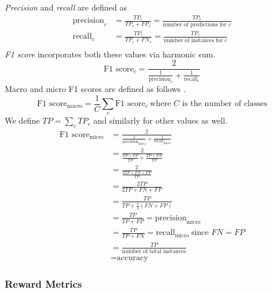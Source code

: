 \documentclass{article}
\begin{document}
\textit{Precision} and \textit{recall} are defined as
\begin{align}
    \text{precision}_c &= \frac{TP_c}{TP_c + FP_c} = \frac{TP_c}{\text{number of predictions for $c$}} \label{prec}\\
    \text{recall}_c &= \frac{TP_c}{TP_c + FN_c} = \frac{TP_c}{\text{number of instances for $c$}} \label{recall}\\
\end{align}
\textit{F1 score} incorporates both these values via harmonic sum.
\begin{equation}
    \text{F1 score}_c = \frac{2}{\frac{1}{\text{precision}_c} + \frac{1}{\text{recall}_c}}
\end{equation}
Macro and micro F1 scores are defined as follows \cite{leung_micro_2022}.
\begin{equation}
    \text{F1 score}_\text{macro} = \frac{1}{C}\sum_c \text{F1 score}_c\ \scriptstyle{\text{where $C$ is the number of classes}}
\end{equation}
We define $TP = \sum_c TP_c$ and similarly for other values as well.
\begin{align}
    \text{F1 score}_\text{micro} 
    &= \frac{2}{\frac{1}{\text{precision}_\text{micro}} + \frac{1}{\text{recall}_\text{micro}}}\\
    &= \frac{2}{\frac{TP+FP}{TP} + \frac{TP+FN}{TP}}\\
    &= \frac{2}{\frac{2TP+FN+FP}{TP}}\\
    &= \frac{2TP}{2TP+FN+FP}\\
    &= \frac{TP}{TP+\frac{1}{2}(FN+FP)}\\
    &= \frac{TP}{TP+FP} = \text{precision}_\text{micro}\\
    &= \frac{TP}{TP+FN} = \text{recall}_\text{micro}\ \scriptstyle{\text{since $FN=FP$}}\\
    &= \frac{TP}{\text{number of total instances}}\\
    &= \text{accuracy}
\end{align}
\subsubsection{Reward Metrics}
\end{document}
